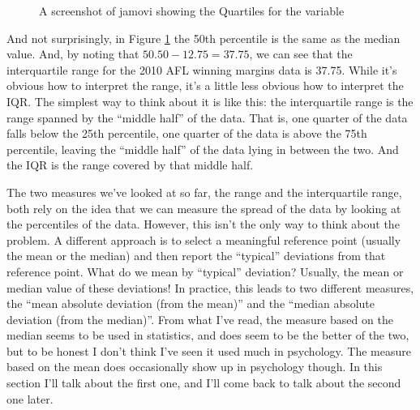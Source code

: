 \vspace{1cm}
\begin{figure}[h]
\begin{center}
\caption{A screenshot of jamovi showing the Quartiles for the  variable }
\label{fig:aflsmall_margins_iqr}
\HR
\end{center}
\end{figure}

And not surprisingly, in Figure \ref{fig:aflsmall_margins_iqr} the 50th percentile is the same as the median value. And, by noting that $50.50 - 12.75 = 37.75$, we can see that the interquartile range for the 2010 AFL winning margins data is 37.75. While it's obvious how to interpret the range, it's a little less obvious how to interpret the IQR. The simplest way to think about it is like this: the interquartile range is the range spanned by the ``middle half'' of the data. That is, one quarter of the data falls below the 25th percentile, one quarter of the data is above the 75th percentile, leaving the ``middle half'' of the data lying in between the two. And the IQR is the range covered by that middle half.



The two measures we've looked at so far, the range and the interquartile range, both rely on the idea that we can measure the spread of the data by looking at the percentiles of the data. However, this isn't the only way to think about the problem. A different approach is to select a meaningful reference point (usually the mean or the median) and then report the ``typical'' deviations from that reference point. What do we mean by ``typical'' deviation? Usually, the mean or median value of these deviations! In practice, this leads to two different measures, the ``mean absolute deviation (from the mean)'' and the ``median absolute deviation (from the median)''. From what I've read, the measure based on the median seems to be used in statistics, and does seem to be the better of the two, but to be honest I don't think I've seen it used much in psychology. The measure based on the mean does occasionally show up in psychology though. In this section I'll talk about the first one, and I'll come back to talk about the second one later.

